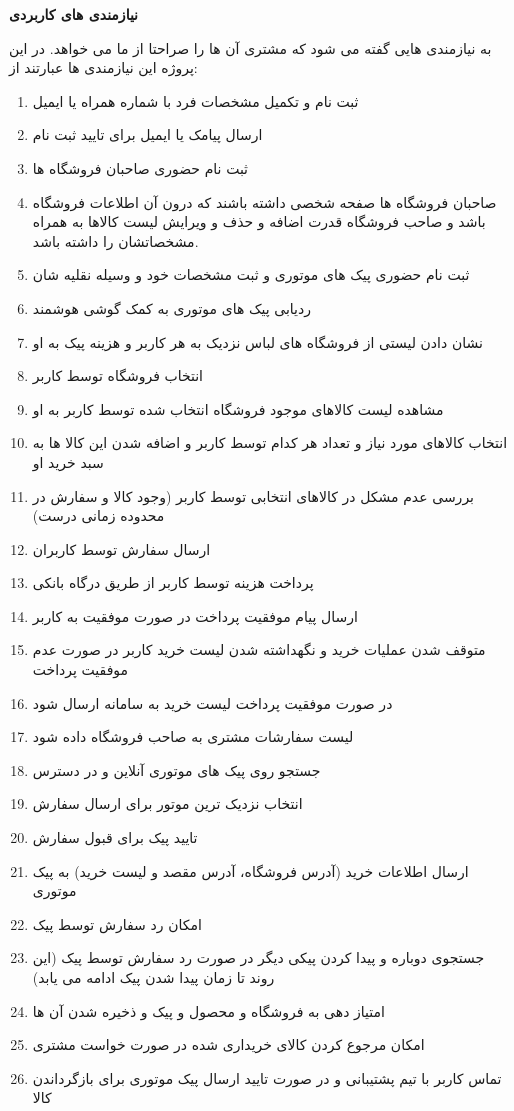 \documentclass[12pt,a4paper]{article}
\begin{document}
	\textbf{نیازمندی های کاربردی} 
	
	
	به نیازمندی هایی گفته می شود که مشتری آن ها را صراحتا از ما می خواهد. در این پروژه این نیازمندی ها عبارتند از:
\begin{enumerate}
	\item
	ثبت نام و تکمیل مشخصات فرد با شماره همراه یا ایمیل
	\item
	ارسال پیامک یا ایمیل برای تایید ثبت نام
	\item
	ثبت نام حضوری صاحبان فروشگاه ها
	\item
	صاحبان فروشگاه ها صفحه شخصی داشته باشند که درون آن اطلاعات فروشگاه باشد و صاحب فروشگاه قدرت اضافه و حذف و ویرایش لیست کالاها به همراه مشخصاتشان را داشته باشد.
	\item
	ثبت نام حضوری پیک های موتوری و ثبت مشخصات خود و وسیله نقلیه شان
\item
ردیابی پیک های موتوری به کمک گوشی هوشمند
\item
نشان دادن لیستی از فروشگاه های لباس نزدیک به هر کاربر و هزینه پیک به او
\item
انتخاب فروشگاه توسط کاربر
\item
مشاهده لیست کالاهای موجود فروشگاه انتخاب شده توسط کاربر به او
\item
انتخاب کالاهای مورد نیاز و تعداد هر کدام توسط کاربر و اضافه شدن این کالا ها به سبد خرید او
\item
بررسی عدم مشکل در کالاهای انتخابی توسط کاربر (وجود کالا و سفارش در محدوده زمانی درست)
\item
ارسال سفارش توسط کاربران
\item
پرداخت هزینه توسط کاربر از طریق درگاه بانکی
\item
ارسال پیام موفقیت پرداخت در صورت موفقیت به کاربر
\item
متوقف شدن عملیات خرید و نگهداشته شدن لیست خرید کاربر در صورت عدم موفقیت پرداخت
\item
در صورت موفقیت پرداخت لیست خرید به سامانه ارسال شود
\item
لیست سفارشات مشتری به صاحب فروشگاه داده شود
\item
جستجو روی پیک های موتوری آنلاین و در دسترس 
\item
انتخاب نزدیک ترین موتور برای ارسال سفارش
\item
تایید پیک برای قبول سفارش
\item
ارسال اطلاعات خرید (آدرس فروشگاه، آدرس مقصد و لیست خرید) به پیک موتوری
\item
	امکان رد سفارش توسط پیک
\item
جستجوی دوباره و پیدا کردن پیکی دیگر در صورت رد سفارش توسط پیک (این روند تا زمان پیدا شدن پیک ادامه می یابد)
\item
امتیاز دهی به فروشگاه و محصول و پیک و ذخیره شدن آن ها
\item
امکان مرجوع کردن کالای خریداری شده در صورت خواست مشتری
\item
تماس کاربر با تیم پشتیبانی و در صورت تایید ارسال پیک موتوری برای بازگرداندن کالا
	
\end{enumerate}
\end{document}
